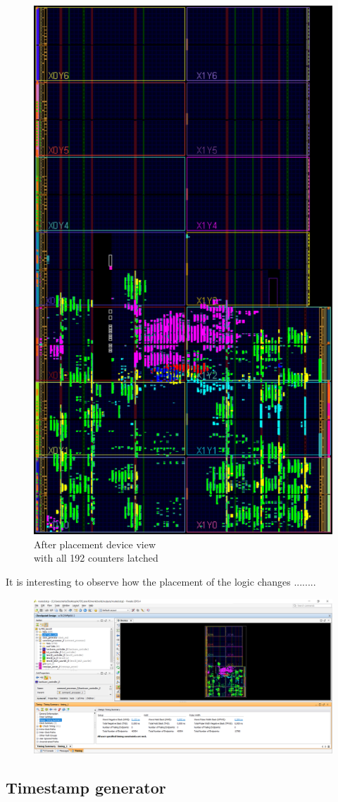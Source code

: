 \begin{figure}[H]
\begin{minipage}{.5\textwidth}
		\includegraphics[width=.85\linewidth]{IMG/ch4/routed_colored_perfect}
		\caption{After placement device view\\ with all 192 counters latched}
		\label{fig:allcounters}
	\end{minipage}
\end{figure}
\noindent It is interesting to observe how the placement of the logic changes ........

\begin{figure}[H]
	\centering
	\includegraphics[width=0.95\linewidth]{IMG/ch4/TIMING_perfect}
	\caption{}
	\label{fig:timingperfect}
\end{figure}

\subsection{Timestamp generator}\label{Timestamp}


